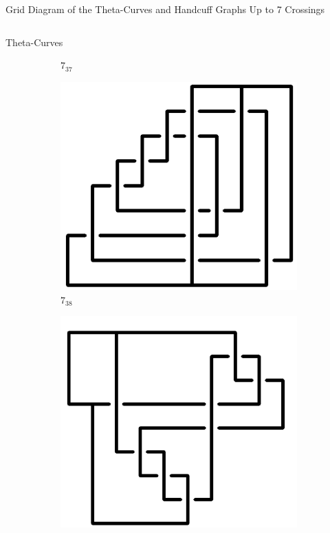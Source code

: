 \documentclass[final]{beamer}
\begin{document}
\begin{frame}[t]
\begin{alertblock}{Grid Diagram of the Theta-Curves and Handcuff Graphs Up to 7 Crossings}
\begin{columns}[t]
\begin{column}{0.5\textwidth}
\begin{alertblock}{Theta-Curves}
\begin{figure}
\begin{subfigure}{0.075\textwidth}
    \caption{$7_{37}$} 
    \end{subfigure}
    \begin{subfigure}{0.075\textwidth}
    \includegraphics[width=\columnwidth]{../Midterm_Poster/grid_diagram/theta_7_38.png}
    \caption{$7_{38}$} 
    \end{subfigure}
    \begin{subfigure}{0.075\textwidth}
    \includegraphics[width=\columnwidth]{../Midterm_Poster/grid_diagram/theta_7_39.png}

\end{subfigure}
\end{figure}
\end{alertblock}
\end{column}
\end{columns}
\end{alertblock}
\end{frame}
\end{document}
